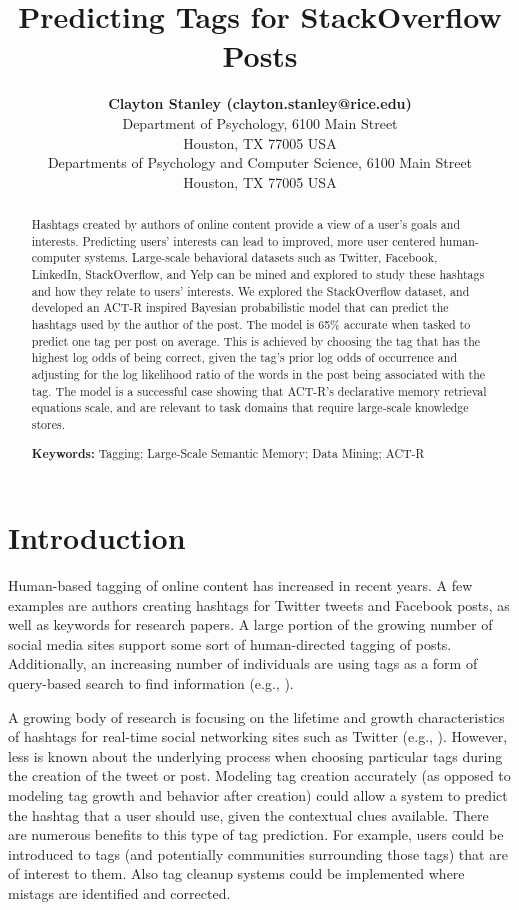 \documentclass[10pt,letterpaper]{article}
\title{Predicting Tags for StackOverflow Posts}
\author{{\large \bf Clayton Stanley (clayton.stanley@rice.edu)} \\
  Department of Psychology, 6100 Main Street \\
  Houston, TX 77005 USA 
  \AND {\large \bf Michael D. Byrne (byrne@rice.edu)} \\
  Departments of Psychology and Computer Science, 6100 Main Street \\
  Houston, TX 77005 USA }
\begin{document}
\maketitle

\frenchspacing

\begin{abstract}
  Hashtags created by authors of online content provide a view of a user's goals and interests.
  Predicting users' interests can lead to improved, more user centered human-computer systems.
  Large-scale behavioral datasets such as Twitter, Facebook, LinkedIn, StackOverflow, and Yelp can be mined and explored to study these hashtags and how they relate to users' interests.
  We explored the StackOverflow dataset, and developed an ACT-R inspired Bayesian probabilistic model that can predict the hashtags used by the author of the post.
  The model is 65\% accurate when tasked to predict one tag per post on average.
  This is achieved by choosing the tag that has the highest log odds of being correct,
  given the tag's prior log odds of occurrence and adjusting for the log likelihood ratio of the words in the post being associated with the tag.
  The model is a successful case showing that ACT-R's declarative memory retrieval equations scale, and are relevant to task domains that require large-scale knowledge stores.

  \textbf{Keywords:}
  Tagging; Large-Scale Semantic Memory; Data Mining; ACT-R
\end{abstract}

\section{Introduction}

Human-based tagging of online content has increased in recent years.
A few examples are authors creating hashtags for Twitter tweets and Facebook posts, as well as keywords for research papers.
A large portion of the growing number of social media sites support some sort of human-directed tagging of posts.
Additionally, an increasing number of individuals are using tags as a form of query-based search to find information
(e.g., ).

A growing body of research is focusing on the lifetime and growth characteristics of hashtags for real-time social networking sites such as Twitter
(e.g., ).
However, less is known about the underlying process when choosing particular tags during the creation of the tweet or post.
Modeling tag creation accurately (as opposed to modeling tag growth and behavior after creation) could allow a system to predict the hashtag that a user should use, given the contextual clues available.
There are numerous benefits to this type of tag prediction.
For example, users could be introduced to tags (and potentially communities surrounding those tags) that are of interest to them.
Also tag cleanup systems could be implemented where mistags are identified and corrected.
\end{document}

